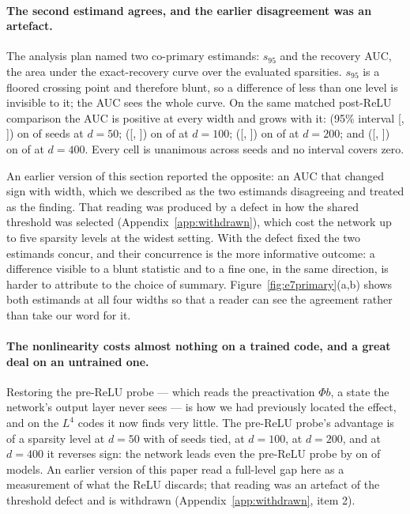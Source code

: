 \paragraph{The second estimand agrees, and the earlier disagreement was an artefact.} The analysis
plan named two co-primary estimands: $s_{95}$ and the recovery AUC, the area under the exact-recovery
curve over the evaluated sparsities. $s_{95}$ is a floored crossing point and therefore blunt, so a
difference of less than one level is invisible to it; the AUC sees the whole curve. On the same
matched post-ReLU comparison the AUC is positive at every width and grows with it:
\AucFiftyDiff{} (95\% interval [\AucFiftyCiLow, \AucFiftyCiHigh]) on \AucFiftyNetWins{} of
\EsevenSeeds{} seeds at $d=50$; \AucHundredDiff{} ([\AucHundredCiLow, \AucHundredCiHigh]) on
\AucHundredNetWins{} of \EsevenSeeds{} at $d=100$; \AucTwoHundredDiff{}
([\AucTwoHundredCiLow, \AucTwoHundredCiHigh]) on \AucTwoHundredNetWins{} of \EsevenSeeds{} at
$d=200$; and \AucFourHundredDiff{}
([\AucFourHundredCiLow, \AucFourHundredCiHigh]) on \AucFourHundredNetWins{} of \ScSeeds{} at
$d=400$. Every cell is unanimous across seeds and no interval covers zero.

An earlier version of this section reported the opposite: an AUC that changed sign with width, which
we described as the two estimands disagreeing and treated as the finding. That reading was produced
by a defect in how the shared threshold was selected (Appendix~\ref{app:withdrawn}), which cost the
network up to five sparsity levels at the widest setting. With the defect fixed the two estimands
concur, and their concurrence is the more informative outcome: a difference visible to a blunt
statistic and to a fine one, in the same direction, is harder to attribute to the choice of summary.
Figure~\ref{fig:e7primary}(a,b)
shows both estimands at all four widths so that a reader can see the agreement rather than take our
word for it.

\paragraph{The nonlinearity costs almost nothing on a trained code, and a great deal on an
untrained one.} Restoring the pre-ReLU probe --- which reads the preactivation $\Phi b$, a state the
network's output layer never sees --- is how we had previously located the effect, and on the $L^4$
codes it now finds very little. The pre-ReLU probe's advantage is \PrimLfourFiftyPreDiff{} of a
sparsity level at $d=50$ with \PrimLfourFiftyPreTies{} of \EsevenSeeds{} seeds tied,
\PrimLfourHundredPreDiff{} at $d=100$, \PrimLfourTwoHundredPreDiff{} at $d=200$, and at $d=400$ it
reverses sign: the network leads even the pre-ReLU probe by \PrimLfourFourHundredPreDiff{} on
\PrimLfourFourHundredPreNetWins{} of \ScSeeds{} models. An earlier version of this paper read a
full-level gap here as a measurement of what the ReLU discards; that reading was an artefact of the
threshold defect and is withdrawn (Appendix~\ref{app:withdrawn}, item 2).

